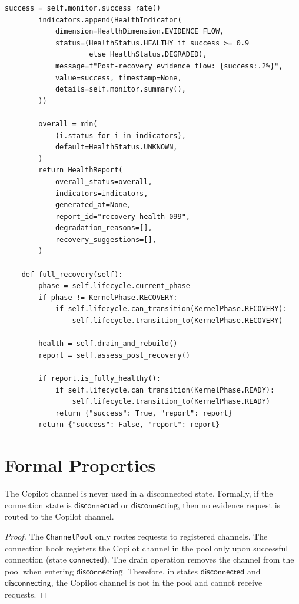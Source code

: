 \documentclass[11pt]{article}
\begin{document}
\begin{lstlisting}[style=jugeo-python,
  caption={Recovery workflow with pool drain and re-registration},
  label={lst:recovery}]
        success = self.monitor.success_rate()
        indicators.append(HealthIndicator(
            dimension=HealthDimension.EVIDENCE_FLOW,
            status=(HealthStatus.HEALTHY if success >= 0.9
                    else HealthStatus.DEGRADED),
            message=f"Post-recovery evidence flow: {success:.2%}",
            value=success, timestamp=None,
            details=self.monitor.summary(),
        ))

        overall = min(
            (i.status for i in indicators),
            default=HealthStatus.UNKNOWN,
        )
        return HealthReport(
            overall_status=overall,
            indicators=indicators,
            generated_at=None,
            report_id="recovery-health-099",
            degradation_reasons=[],
            recovery_suggestions=[],
        )

    def full_recovery(self):
        phase = self.lifecycle.current_phase
        if phase != KernelPhase.RECOVERY:
            if self.lifecycle.can_transition(KernelPhase.RECOVERY):
                self.lifecycle.transition_to(KernelPhase.RECOVERY)

        health = self.drain_and_rebuild()
        report = self.assess_post_recovery()

        if report.is_fully_healthy():
            if self.lifecycle.can_transition(KernelPhase.READY):
                self.lifecycle.transition_to(KernelPhase.READY)
            return {"success": True, "report": report}
        return {"success": False, "report": report}
\end{lstlisting}

\section{Formal Properties}\label{sec:formal}

\begin{theorem}\label{thm:connsafe}
The Copilot channel is never used in a disconnected state.
Formally, if the connection state is $\mathsf{disconnected}$
or $\mathsf{disconnecting}$, then no evidence request is
routed to the Copilot channel.
\end{theorem}
\begin{proof}
The \texttt{ChannelPool} only routes requests to registered
channels.  The connection hook registers the Copilot channel
in the pool only upon successful connection (state
$\mathsf{connected}$).  The drain operation removes the
channel from the pool when entering $\mathsf{disconnecting}$.
Therefore, in states $\mathsf{disconnected}$ and
$\mathsf{disconnecting}$, the Copilot channel is not in the
pool and cannot receive requests.
\end{proof}
\end{document}
